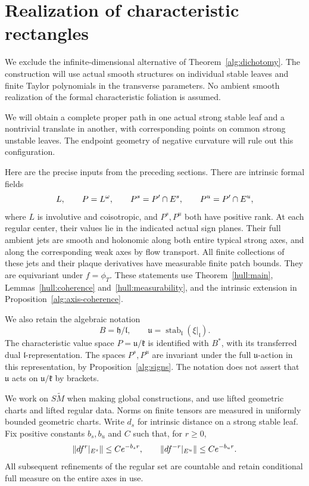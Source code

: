 \section{Realization of characteristic rectangles}
\label{real:section}

We exclude the infinite-dimensional alternative of
Theorem~\ref{alg:dichotomy}. The construction will use actual smooth
structures on individual stable leaves and finite Taylor polynomials
in the transverse parameters. No ambient smooth realization of the
formal characteristic foliation is assumed.

We will obtain a complete proper path in one actual strong stable leaf
and a nontrivial translate in another, with corresponding points on
common strong unstable leaves. The endpoint geometry of negative
curvature will rule out this configuration.

Here are the precise inputs from the preceding sections. There are
intrinsic formal fields
\[
 L,\qquad P=L^\omega,\qquad
 P^s=P'\cap E^s,\qquad P^u=P'\cap E^u,
\]
where $L$ is involutive and coisotropic, and $P^s,P^u$ both have
positive rank. At each regular center, their values lie in the
indicated actual sign planes. Their full ambient jets are smooth
and holonomic along both entire typical strong axes, and along the
corresponding weak axes by flow transport. All finite collections of
these jets and their plaque derivatives have measurable finite patch
bounds. They are equivariant under $f=\phi_T$. These statements use
Theorem~\ref{hull:main}, Lemmas~\ref{hull:coherence}
and~\ref{hull:measurability}, and the intrinsic extension in
Proposition~\ref{alg:axis-coherence}.

We also retain the algebraic notation
\[
 B=\mathfrak h/\mathfrak l,
 \qquad \mathfrak u=\operatorname{stab}_{\mathfrak l}
                        (\xi|_{\mathfrak l}).
\]
The characteristic value space $P=\mathfrak u/\mathfrak k$ is
identified with $B^*$, with its transferred dual
$\mathfrak l$-representation. The spaces $P^s,P^u$ are invariant
under the full $\mathfrak u$-action in this representation, by
Proposition~\ref{alg:signs}. The notation does not assert that
$\mathfrak u$ acts on $\mathfrak u/\mathfrak k$ by brackets.

We work on $S\widetilde M$ when making global constructions, and
use lifted geometric charts and lifted regular data. Norms on finite
tensors are measured in uniformly bounded geometric charts. Write
$d_s$ for intrinsic distance on a strong stable leaf. Fix positive
constants $b_s,b_u$ and $C$ such that, for $r\ge0$,
\begin{equation}\label{real:hyperbolicity}
 \|df^r|_{E^s}\|\le C e^{-b_s r},
 \qquad
 \|df^{-r}|_{E^u}\|\le C e^{-b_u r}.
\end{equation}
All subsequent refinements of the regular set are countable and
retain conditional full measure on the entire axes in use.

